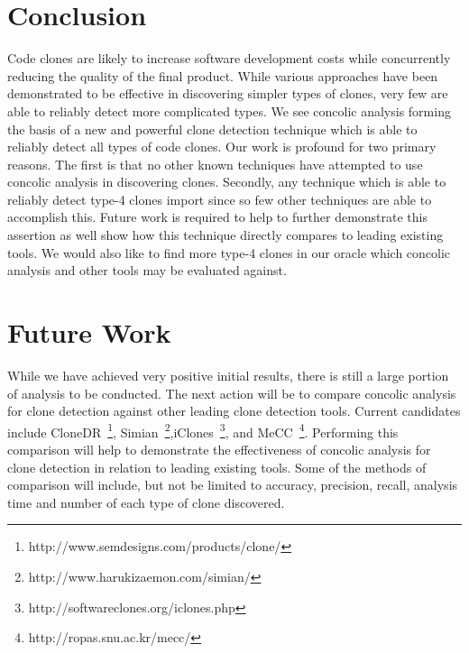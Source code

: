 \documentclass{sig-alternate}
\begin{document}












\section{Conclusion}
\label{sec: conclusion}

Code clones are likely to increase software development costs while concurrently reducing the quality of the final product. While various approaches have been demonstrated to be effective in discovering simpler types of clones, very few are able to reliably detect more complicated types. We see concolic analysis forming the basis of a new and powerful clone detection technique which is able to reliably detect all types of code clones. Our work is profound for two primary reasons. The first is that no other known techniques have attempted to use concolic analysis in discovering clones. Secondly, any technique which is able to reliably detect type-4 clones import since so few other techniques are able to accomplish this. Future work is required to help to further demonstrate this assertion as well show how this technique directly compares to leading existing tools. We would also like to find more type-4 clones in our oracle which concolic analysis and other tools may be evaluated against.




\section{Future Work}
\label{sec: futurework}

While we have achieved very positive initial results, there is still a large portion of analysis to be conducted. The next action will be to compare concolic analysis for clone detection against other leading clone detection tools. Current candidates include CloneDR~\footnote{http://www.semdesigns.com/products/clone/}, Simian~\footnote{http://www.harukizaemon.com/simian/},iClones~\footnote{http://softwareclones.org/iclones.php}, and MeCC~\footnote{http://ropas.snu.ac.kr/mecc/}. Performing this comparison will help to demonstrate the effectiveness of concolic analysis for clone detection in relation to leading existing tools. Some of the methods of comparison will include, but not be limited to accuracy, precision, recall, analysis time and number of each type of clone discovered. 
\end{document}
